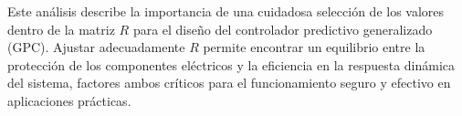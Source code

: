 \documentclass[journal]{IEEEtran}
\begin{document}
Este análisis describe la importancia de una cuidadosa selección de los valores dentro de la matriz \( R \) para el diseño del controlador predictivo generalizado (GPC). Ajustar adecuadamente \( R \) permite encontrar un equilibrio entre la protección de los componentes eléctricos y la eficiencia en la respuesta dinámica del sistema, factores ambos críticos para el funcionamiento seguro y efectivo en aplicaciones prácticas.


%
%



%
%
\end{document}
